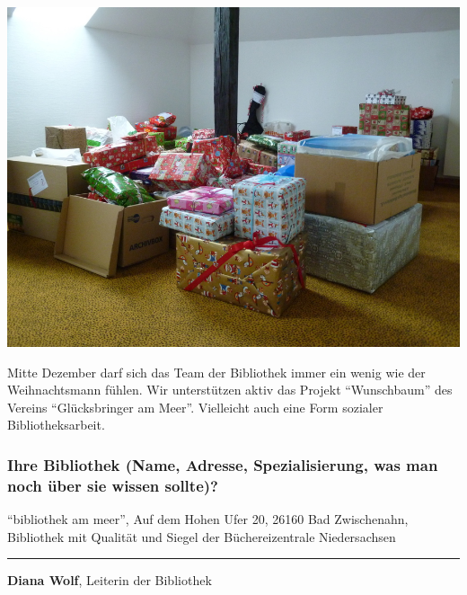\begin{center}
\includegraphics{am-meer/img/projekt-wunschbaum.jpg}
\end{center}

Mitte Dezember darf sich das Team der Bibliothek immer ein wenig wie der
Weihnachtsmann fühlen. Wir unterstützen aktiv das Projekt
\enquote{Wunschbaum} des Vereins \enquote{Glücksbringer am Meer}.
Vielleicht auch eine Form sozialer Bibliotheksarbeit.

\hypertarget{ihre-bibliothek-name-adresse-spezialisierung-was-man-noch-uxfcber-sie-wissen-sollte}{%
\subsubsection*{Ihre Bibliothek (Name, Adresse, Spezialisierung, was man noch
über sie wissen
sollte)?}\label{ihre-bibliothek-name-adresse-spezialisierung-was-man-noch-uxfcber-sie-wissen-sollte}}

\enquote{bibliothek am meer}, Auf dem Hohen Ufer 20, 26160 Bad
Zwischenahn, Bibliothek mit Qualität und Siegel der Büchereizentrale
Niedersachsen

\begin{center}\rule{0.5\linewidth}{\linethickness}\end{center}

\textbf{Diana Wolf}, Leiterin der Bibliothek